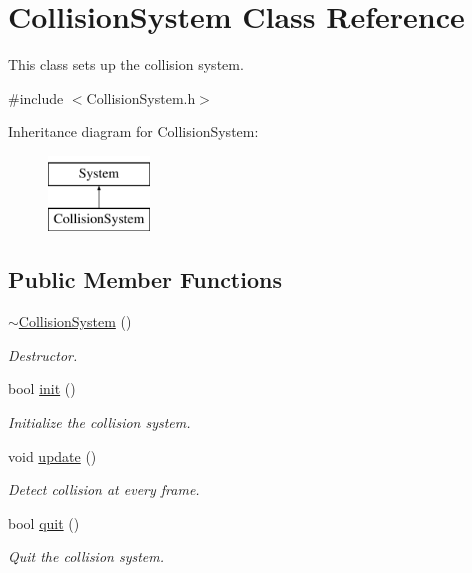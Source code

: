 \hypertarget{class_collision_system}{}\section{Collision\+System Class Reference}
\label{class_collision_system}


This class sets up the collision system.  




{\ttfamily \#include $<$Collision\+System.\+h$>$}

Inheritance diagram for Collision\+System\+:\begin{figure}[H]
\begin{center}
\leavevmode
\includegraphics[height=2.000000cm]{class_collision_system}
\end{center}
\end{figure}
\subsection*{Public Member Functions}
\begin{DoxyCompactItemize}
\item 
\mbox{\label{class_collision_system_a128d2a8b457f119368f0c9fc95ed61f6}} 
\mbox{\hyperlink{class_collision_system_a128d2a8b457f119368f0c9fc95ed61f6}{$\sim$\+Collision\+System}} ()
\begin{DoxyCompactList}\small\item\em Destructor. \end{DoxyCompactList}\item 
\mbox{\label{class_collision_system_a2f624088e9fd5ee6727bd6056d817a84}} 
bool \mbox{\hyperlink{class_collision_system_a2f624088e9fd5ee6727bd6056d817a84}{init}} ()
\begin{DoxyCompactList}\small\item\em Initialize the collision system. \end{DoxyCompactList}\item 
void \mbox{\hyperlink{class_collision_system_ac437e5f41c5e333bf852a5fc34c0c127}{update}} ()
\begin{DoxyCompactList}\small\item\em Detect collision at every frame. \end{DoxyCompactList}\item 
\mbox{\label{class_collision_system_ae9119313d5718dc4206020f06e6a9718}} 
bool \mbox{\hyperlink{class_collision_system_ae9119313d5718dc4206020f06e6a9718}{quit}} ()
\begin{DoxyCompactList}\small\item\em Quit the collision system. \end{DoxyCompactList}\end{DoxyCompactItemize}
